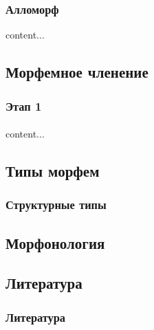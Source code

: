 \begin{frame}
    \frametitle{Алломорф}
    content...
\end{frame}

\subsection{Морфемное членение}


\begin{frame}
    \frametitle{Этап 1}
    \framesubtitle{}

    content...
\end{frame}


\subsection{Типы морфем}


\begin{frame}
    \frametitle{Структурные типы}


\end{frame}

\subsection{Морфонология}




\subsection{Литература}


\begin{frame}
    \frametitle{Литература}
    \printbibliography
\end{frame}
